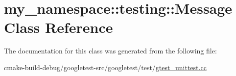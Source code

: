 \hypertarget{classmy__namespace_1_1testing_1_1Message}{}\section{my\+\_\+namespace\+::testing\+::Message Class Reference}
\label{classmy__namespace_1_1testing_1_1Message}


The documentation for this class was generated from the following file\+:\begin{DoxyCompactItemize}
\item 
cmake-\/build-\/debug/googletest-\/src/googletest/test/\mbox{\hyperlink{gtest__unittest_8cc}{gtest\+\_\+unittest.\+cc}}\end{DoxyCompactItemize}
